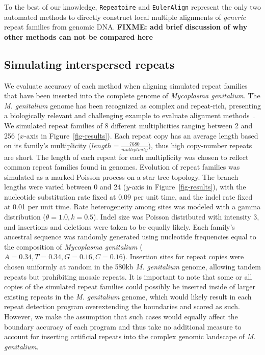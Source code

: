 \documentclass[12pt,journal,draftcls,letterpaper,onecolumn]{IEEEtran}
\begin{document}
To the best of our knowledge, \texttt{Repeatoire} and
\texttt{EulerAlign} represent the only two automated methods to directly
construct local multiple alignments of \emph{generic} repeat families from genomic DNA.
\textbf{FIXME: add brief discussion of why other methods can not be compared here}

\subsection*{Simulating interspersed repeats}
We evaluate accuracy of each method when aligning simulated repeat
families that have been inserted into the complete genome of
\emph{Mycoplasma genitalium}. The \emph{M. genitalium} genome has been recognized
as complex and repeat-rich, presenting a biologically
relevant and challenging example to evaluate alignment
methods~\cite{ref-mycoplasma}. We simulated repeat families of 8
different multiplicities ranging between 2 and 256 ($x$-axis in
Figure~\ref{fig-results}).  Each repeat copy has an average length
based on its family's multiplicity
($length=\frac{7680}{multiplicity}$), thus high copy-number repeats
are short.  The length of each repeat for each multiplicity was chosen
to reflect common repeat families found in genomes. Evolution of repeat families was simulated as a marked
Poisson process on a star tree
topology.  The branch lengths were varied between 0 and 24 ($y$-axis
in Figure~\ref{fig-results}), with the nucleotide substitution rate
fixed at 0.09 per unit time, and the indel rate fixed at 0.01 per
unit time.  Rate heterogeneity among sites was modeled with a gamma
distribution ($\theta = 1.0, k = 0.5$).  Indel size was
Poisson distributed with intensity 3, and insertions and deletions
were taken to be equally likely.  Each family's ancestral
sequence was randomly generated using nucleotide frequencies equal to
the composition of \emph{Mycoplasma genitalium}
($A=0.34,T=0.34,G=0.16,C=0.16$). Insertion sites for repeat copies
were chosen uniformly at random in the 580kb \textit{M. genitalium} genome,
allowing tandem repeats but prohibiting mosaic repeats. It is important to note that some or all copies of the simulated repeat families
could possibly be inserted inside of larger existing repeats in the  \textit{M. genitalium} genome, which would
likely result in each repeat detection program overextending the boundaries and scored as such. However, we make the assumption
that such cases would equally affect the boundary accuracy of each program and thus take no additional measure to account for inserting
artificial repeats into the complex genomic landscape of \textit{M. genitalium}.
\end{document}
